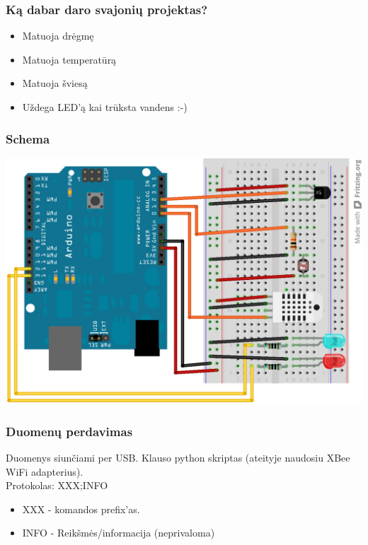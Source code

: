 \documentclass[12pt,a4paper]{beamer}
\begin{document}
\begin{frame}
    \frametitle{Ką dabar daro svajonių projektas?}

    \begin{itemize}
        \item Matuoja drėgmę
        \item Matuoja temperatūrą
        \item Matuoja šviesą
        \item Uždega LED'ą kai trūksta vandens :-)
    \end{itemize}
    
\end{frame}

\begin{frame}
    \frametitle{Schema}
    \includegraphics[scale=0.2]{img/schema.png}
\end{frame}

\begin{frame}
    \frametitle{Duomenų perdavimas}

    Duomenys siunčiami per USB. Klauso python skriptas (ateityje naudosiu XBee WiFi adapterius).\\
    \vskip1cm
    Protokolas: XXX;INFO

    \begin{itemize}
        \item XXX - komandos prefix'as.
        \item INFO - Reikšmės/informacija (neprivaloma)
    \end{itemize}
\end{frame}
\end{document}
